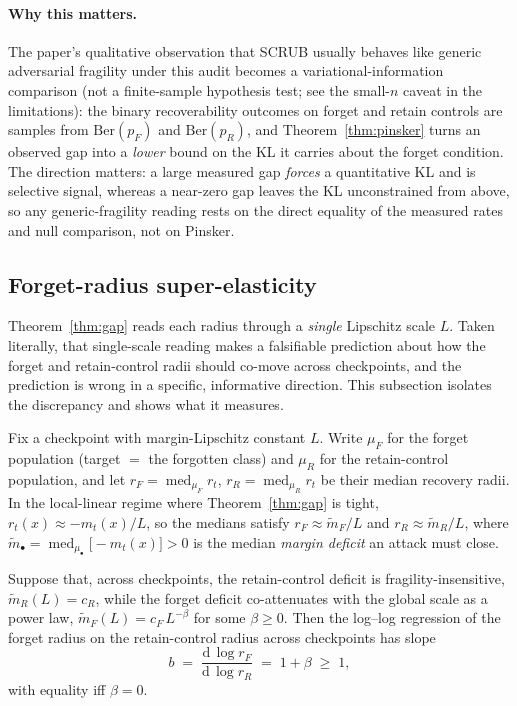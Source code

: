 \paragraph{Why this matters.} The paper's qualitative observation that SCRUB
usually behaves like generic adversarial fragility under this audit becomes a
variational-information comparison (not a finite-sample hypothesis test; see
the small-$n$ caveat in the limitations): the binary
recoverability outcomes on forget and retain controls are samples from
$\mathrm{Ber}(p_F)$ and $\mathrm{Ber}(p_R)$, and Theorem~\ref{thm:pinsker}
turns an observed gap into a \emph{lower} bound on the KL it carries about the
forget condition. The direction matters: a large measured gap
\emph{forces} a quantitative KL and is selective signal, whereas a
near-zero gap leaves the KL unconstrained from above, so any
generic-fragility reading rests on the direct equality of the measured rates
and null comparison, not on Pinsker.

\subsection{Forget-radius super-elasticity}
\label{sec:elasticity}

Theorem~\ref{thm:gap} reads each radius through a \emph{single} Lipschitz
scale $L$. Taken literally, that single-scale reading makes a falsifiable
prediction about how the forget and retain-control radii should co-move across
checkpoints, and the prediction is wrong in a specific, informative direction.
This subsection isolates the discrepancy and shows what it measures.

Fix a checkpoint with margin-Lipschitz constant $L$. Write $\mu_F$ for the
forget population (target $=$ the forgotten class) and $\mu_R$ for the
retain-control population, and let
$r_F = \operatorname{med}_{\mu_F} r_t$, $r_R = \operatorname{med}_{\mu_R} r_t$
be their median recovery radii. In the local-linear regime where
Theorem~\ref{thm:gap} is tight, $r_t(x)\approx -m_t(x)/L$, so the medians
satisfy $r_F \approx \tilde m_F/L$ and $r_R \approx \tilde m_R/L$, where
$\tilde m_\bullet = \operatorname{med}_{\mu_\bullet}\!\bigl[-m_t(x)\bigr]>0$ is
the median \emph{margin deficit} an attack must close.

\begin{proposition}
\label{prop:elasticity}
Suppose that, across checkpoints, the retain-control deficit is
fragility-insensitive, $\tilde m_R(L) = c_R$, while the forget deficit
co-attenuates with the global scale as a power law,
$\tilde m_F(L) = c_F\,L^{-\beta}$ for some $\beta \ge 0$. Then the
log--log regression of the forget radius on the retain-control radius across
checkpoints has slope
\begin{equation}
  b \;=\; \frac{\mathrm{d}\,\log r_F}{\mathrm{d}\,\log r_R} \;=\; 1+\beta \;\ge\; 1,
  \label{eq:elasticity}
\end{equation}
with equality iff $\beta = 0$.
\end{proposition}

